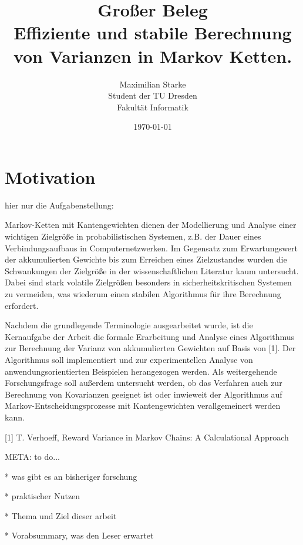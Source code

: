 \documentclass[a4paper]{article}
\title{\large Großer Beleg\\ \medskip \LARGE Effiziente und stabile Berechnung von Varianzen in Markov Ketten.}
\author{Maximilian Starke \\ Student der TU Dresden \\ Fakultät Informatik}
\date{\today}
\theoremstyle{nonumberplain}
\begin{document}
\maketitle

\vspace{2cm}

\tableofcontents

\pagebreak

\newenvironment{meta}
{\begin{center} \Large \color{red} META: \hspace{2ex} \large \color{blue}}
{\end{center}}

\section{Motivation}

hier nur die Aufgabenstellung:
\bigskip 

Markov-Ketten mit Kantengewichten dienen der Modellierung und Analyse einer wichtigen
Zielgröße in probabilistischen Systemen, z.B. der Dauer eines
Verbindungsaufbaus in Computernetzwerken. Im Gegensatz zum Erwartungswert der akkumulierten Gewichte bis zum Erreichen eines Zielzustandes wurden die
Schwankungen der Zielgröße in der wissenschaftlichen Literatur kaum untersucht.
Dabei sind stark volatile Zielgrößen besonders in sicherheitskritischen Systemen zu
vermeiden, was wiederum einen stabilen Algorithmus für ihre Berechnung
erfordert.

Nachdem die grundlegende Terminologie ausgearbeitet wurde, ist die Kernaufgabe
der Arbeit die formale Erarbeitung und Analyse eines Algorithmus zur Berechnung
der Varianz von akkumulierten Gewichten auf Basis von [1]. Der Algorithmus soll implementiert und zur experimentellen Analyse von anwendungsorientierten Beispielen herangezogen werden.
Als weitergehende Forschungsfrage soll außerdem untersucht werden, ob das Verfahren auch zur Berechnung von Kovarianzen geeignet ist oder inwieweit der Algorithmus auf Markov-Entscheidungsprozesse mit Kantengewichten verallgemeinert werden kann.


[1] T. Verhoeff, Reward Variance in Markov Chains: A Calculational Approach

\bigskip

\begin{meta}
	to do...
	
	* was gibt es an bisheriger forschung
	
	* praktischer Nutzen
	
	* Thema und Ziel dieser arbeit
	
	* Vorabsummary, was den Leser erwartet
	
\end{meta}
\end{document}
